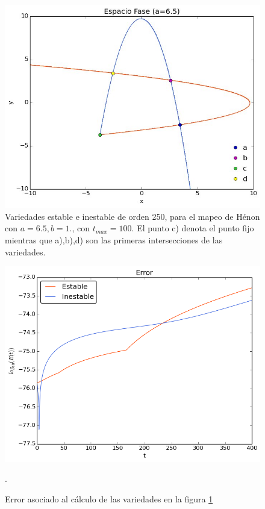 \begin{figure}[H]
\centering
\includegraphics[scale=0.4]{rectangulo-fundamental}
\caption{Variedades estable e inestable de orden 250, para el mapeo de Hénon con $a=6.5,b=1.$, con $t_{max}=100$. El punto c) denota el punto fijo mientras que  a),b),d) son las primeras intersecciones de las variedades.}
\label{rectangulo0}
\end{figure}

\begin{figure}[H]
\centering
\includegraphics[scale=0.6]{error-rectangulo}
\caption{Error asociado al cálculo de las variedades en la figura \ref{rectangulo0}}.
\label{ErrorRectangulo0}
\end{figure} 

